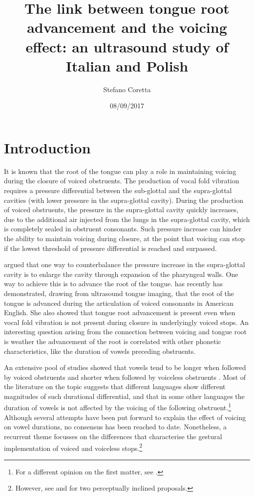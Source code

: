 \documentclass[authoryear, twocolumn]{elsarticle}
\title{The link between tongue root advancement and the voicing effect: an
ultrasound study of Italian and Polish}
\author{Stefano Coretta}
\date{08/09/2017}
\begin{document}
\maketitle

\section{Introduction}\label{introduction}

It is known that the root of the tongue can play a role in maintaining
voicing during the closure of voiced obstruents. The production of vocal
fold vibration requires a pressure differential between the sub-glottal
and the supra-glottal cavities (with lower pressure in the supra-glottal
cavity). During the production of voiced obstruents, the pressure in the
supra-glottal cavity quickly increases, due to the additional air
injected from the lungs in the supra-glottal cavity, which is completely
sealed in obstruent consonants. Such pressure increase can hinder the
ability to maintain voicing during closure, at the point that voicing
can stop if the lowest threshold of pressure differential is reached and
surpassed.

\citet{westbury1983} argued that one way to counterbalance the pressure
increase in the supra-glottal cavity is to enlarge the cavity through
expansion of the pharyngeal walls. One way to achieve this is to advance
the root of the tongue. \citet{ahn2016} has recently has demonstrated,
drawing from ultrasound tongue imaging, that the root of the tongue is
advanced during the articulation of voiced consonants in American
English. She also showed that tongue root advancement is present even
when vocal fold vibration is not present during closure in underlyingly
voiced stops. An interesting question arising from the connection
between voicing and tongue root is weather the advancement of the root
is correlated with other phonetic characteristics, like the duration of
vowels preceding obstruents.

An extensive pool of studies showed that vowels tend to be longer when
followed by voiced obstruents and shorter when followed by voiceless
obstruents \citep{house1953, chen1970, klatt1973, lisker1973}. Most of
the literature on the topic suggests that different languages show
different magnitudes of such durational differential, and that in some
other languages the duration of vowels is not affected by the voicing of
the following
obstruent.\footnote{For a different opinion on the first matter, see \citep{laeufer1992}.}
Although several attempts have been put forward to explain the effect of
voicing on vowel durations, no consensus has been reached to date.
Nonetheless, a recurrent theme focusses on the differences that
characterise the gestural implementation of voiced and voiceless
stops.\footnote{However, see \citep{javkin1976} and \cite{kluender1988} for two perceptually inclined proposals.}
\end{document}

